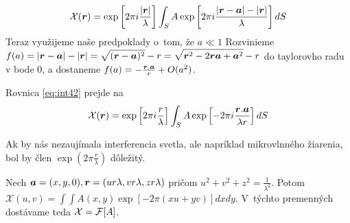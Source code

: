 \begin{equation}
\mathcal{X}(\boldsymbol{r})=
 \exp \left[ 2 \pi i \frac{|\boldsymbol{r}|}{\lambda} \right]
\int_S A
 \exp \left[ 2 \pi i \frac{|\boldsymbol{r}-\boldsymbol{a}|-|\boldsymbol{r}|}{\lambda}
 \right] dS
 \label{eq:int42} 
\end{equation}
Teraz využijeme naše predpoklady o~tom, že $a \ll 1$
Rozvinieme 
$\displaystyle f(a)=|\boldsymbol{r}-\boldsymbol{a}|-|\boldsymbol{r}| =
\sqrt{ (\boldsymbol{r}-\boldsymbol{a})^2 } - r =
\sqrt{ \boldsymbol{r}^2 - 2 \boldsymbol{r}\boldsymbol{a} + \boldsymbol{a}^2 } -r$
do taylorovho radu v bode 0, a dostaneme
$f(a)=-\frac{\boldsymbol{r}.\boldsymbol{a}}{r} +O(a^2)$.

Rovnica \ref{eq:int42} prejde na
\begin{equation}
\mathcal{X}(\boldsymbol{r})=
 \exp \left[ 2 \pi i \frac{r}{\lambda} \right]
\int_S A
 \exp \left[- 2 \pi i \frac{\boldsymbol{r}.\boldsymbol{a}}{\lambda r} \right] dS
\end{equation}

Ak by nás nezaujímala interferencia svetla, ale napríklad mikrovlnného
žiarenia, bol by člen 
$\exp \left(2 \pi \frac{r}{\lambda} \right) $ dôležitý.



Nech $\boldsymbol{a}=(x,y,0), \boldsymbol{r}=(u r \lambda, v r \lambda,z r \lambda)$ pričom
$u^2 + v^2 + z^2=\frac{1}{\lambda^2}$.
Potom $ \displaystyle
\mathcal{X}(u,v)=
\int \int A(x,y)
 \exp \left[- 2 \pi (xu+yv) \right] dx dy$.
V~týchto premenných dostávame teda $\mathcal{X}=\mathcal{F}[A]$.

 \\
 \\
 \\
 \\

